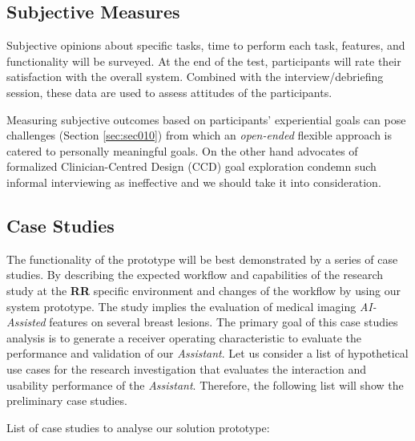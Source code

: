 \subsection{Subjective Measures}

Subjective opinions about specific tasks, time to perform each task, features, and functionality will be surveyed. At the end of the test, participants will rate their satisfaction with the overall system. Combined with the interview/debriefing session, these data are used to assess attitudes of the participants.

Measuring subjective outcomes based on participants' experiential goals can pose challenges (Section \ref{sec:sec010}) from which an {\it open-ended} flexible approach is catered to personally meaningful goals. On the other hand advocates of formalized Clinician-Centred Design (CCD) goal exploration condemn such informal interviewing as ineffective and we should take it into consideration.



\subsection{Case Studies}

The functionality of the prototype will be best demonstrated by a series of case studies. By describing the expected workflow and capabilities of the research study at the \textbf{RR} specific environment and changes of the workflow by using our system prototype. The study implies the evaluation of medical imaging \textit{AI-Assisted} features on several breast lesions. The primary goal of this case studies analysis is to generate a receiver operating characteristic to evaluate the performance and validation of our \textit{Assistant}. Let us consider a list of hypothetical use cases for the research investigation that evaluates the interaction and usability performance of the \textit{Assistant}. Therefore, the following list will show the preliminary case studies.

\hfill

List of case studies to analyse our solution prototype:

